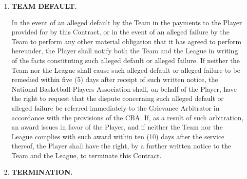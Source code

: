 \documentclass[
]{book}
\begin{document}
\begin{enumerate}
\def\labelenumi{\arabic{enumi}.}
\setcounter{enumi}{14}
\item
  \textbf{TEAM DEFAULT.}

  In the event of an alleged default by the Team in the payments to the Player provided for by this Contract, or in the event of an alleged failure by the Team to perform any other material obligation that it has agreed to perform hereunder, the Player shall notify both the Team and the League in writing of the facts constituting such alleged default or alleged failure. If neither the Team nor the League shall cause such alleged default or alleged failure to be remedied within five (5) days after receipt of such written notice, the National Basketball Players Association shall, on behalf of the Player, have the right to request that the dispute concerning such alleged default or alleged failure be referred immediately to the Grievance Arbitrator in accordance with the provisions of the CBA. If, as a result of such arbitration, an award issues in favor of the Player, and if neither the Team nor the League complies with such award within ten (10) days after the service thereof, the Player shall have the right, by a further written notice to the Team and the League, to terminate this Contract.
\item
  \textbf{TERMINATION.}
\end{enumerate}
\end{document}
